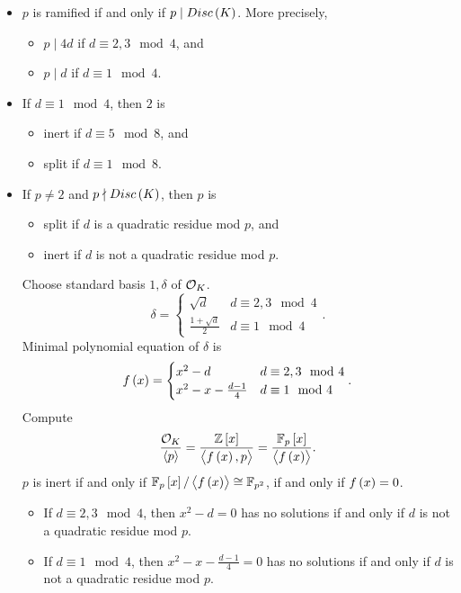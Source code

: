\begin{itemize}
\item $ p $ is ramified if and only if $ p \mid Disc\br{K} $. More precisely,
\begin{itemize}
\item $ p \mid 4d $ if $ d \equiv 2, 3 \mod 4 $, and
\item $ p \mid d $ if $ d \equiv 1 \mod 4 $.
\end{itemize}
\item If $ d \equiv 1 \mod 4 $, then $ 2 $ is
\begin{itemize}
\item inert if $ d \equiv 5 \mod 8 $, and
\item split if $ d \equiv 1 \mod 8 $.
\end{itemize}
\item If $ p \ne 2 $ and $ p \nmid Disc\br{K} $, then $ p $ is
\begin{itemize}
\item split if $ d $ is a quadratic residue mod $ p $, and
\item inert if $ d $ is not a quadratic residue mod $ p $.
\end{itemize}
Choose standard basis $ 1, \delta $ of $ \mathcal{O}_K $.
$$ \delta =
\begin{cases}
\sqrt{d} & d \equiv 2, 3 \mod 4 \\
\tfrac{1 + \sqrt{d}}{2} & d \equiv 1 \mod 4
\end{cases}.
$$
Minimal polynomial equation of $ \delta $ is
$$ f\br{x} =
\begin{cases}
x^2 - d & d \equiv 2, 3 \mod 4 \\
x^2 - x - \tfrac{d - 1}{4} & d \equiv 1 \mod 4
\end{cases}.
$$
Compute
$$ \dfrac{\OO_K}{\abr{p}} = \dfrac{\Z\sbr{x}}{\abr{f\br{x}, p}} = \dfrac{\F_p\sbr{x}}{\abr{f\br{x}}}. $$
$ p $ is inert if and only if $ \F_p\sbr{x} / \abr{f\br{x}} \cong \F_{p^2} $, if and only if $ f\br{x} = 0 $.
\begin{itemize}
\item If $ d \equiv 2, 3 \mod 4 $, then $ x^2 - d = 0 $ has no solutions if and only if $ d $ is not a quadratic residue mod $ p $.
\item If $ d \equiv 1 \mod 4 $, then $ x^2 - x - \tfrac{d - 1}{4} = 0 $ has no solutions if and only if $ d $ is not a quadratic residue mod $ p $.
\end{itemize}
\end{itemize}

\pagebreak

